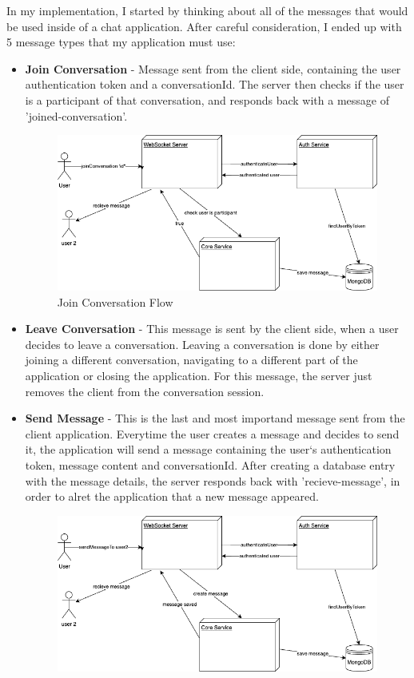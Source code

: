 In my implementation, I started by thinking about all of the messages that would be used inside of a chat application. After careful consideration, I ended up with 5 message types that my application must use:
\begin{itemize}
    \item \textbf{Join Conversation} - Message sent from the client side, containing the user authentication token and a conversationId. The server then checks if the user is a participant of that conversation, and responds back with a message of 'joined-conversation'.
    \begin{figure}[H]
        \centering
        \includegraphics[width=1\linewidth]{licenta-join-conversation.drawio.png}
        \caption*{Join Conversation Flow}
        \label{fig:join-conversation-flow}
    \end{figure}
    \item \textbf{Leave Conversation} - This message is sent by the client side, when a user decides to leave a conversation. Leaving a conversation is done by either joining a different conversation, navigating to a different part of the application or closing the application. For this message, the server just removes the client from the conversation session.
    \item \textbf{Send Message} - This is the last and most importand message sent from the client application. Everytime the user creates a message and decides to send it, the application will send a message containing the user`s authentication token, message content and conversationId. After creating a database entry with the message details, the server responds back with 'recieve-message', in order to alret the application that a new message appeared.
    \begin{figure}[H]
        \centering
        \includegraphics[width=1\linewidth]{licenta-ws.drawio.png}

\end{figure}
\end{itemize}
